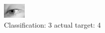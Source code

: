 \begin{figure}[h!]
\begin{center}
\includegraphics[width=0.60\columnwidth]{figures/ID2913_class_3_target_4.png}
\end{center}
\caption{ Classification: 3 actual target: 4}
\label{fig:ID2913_class_3_target_4}
\end{figure}
